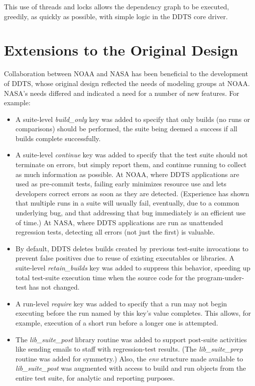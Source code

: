 \documentclass[conference]{IEEEtran}
\begin{document}
This use of threads and locks allows the dependency graph to be executed, greedily, as quickly as possible, with simple logic in the DDTS core driver.

\section{Extensions to the Original Design}

Collaboration between NOAA and NASA has been beneficial to the development of DDTS, whose original design reflected the needs of modeling groups at NOAA. NASA's needs differed and indicated a need for a number of new features. For example:

\begin{itemize}
\item A suite-level \emph{build\_only} key was added to specify that only builds (no runs or comparisons) should be performed, the suite being deemed a success if all builds complete successfully.
\item A suite-level \emph{continue} key was added to specify that the test suite should not terminate on errors, but simply report them, and continue running to collect as much information as possible. At NOAA, where DDTS applications are used as pre-commit tests, failing early minimizes resource use and lets developers correct errors as soon as they are detected. (Experience has shown that multiple runs in a suite will usually fail, eventually, due to a common underlying bug, and that addressing that bug immediately is an efficient use of time.) At NASA, where DDTS applications are run as unattended regression tests, detecting all errors (not just the first) is valuable.
\item By default, DDTS deletes builds created by previous test-suite invocations to prevent false positives due to reuse of existing executables or libraries. A suite-level \emph{retain\_builds} key was added to suppress this behavior, speeding up total test-suite execution time when the source code for the program-under-test has not changed.
\item A run-level \emph{require} key was added to specify that a run may not begin executing before the run named by this key's value completes. This allows, for example, execution of a short run before a longer one is attempted.
\item The \emph{lib\_suite\_post} library routine was added to support post-suite activities like sending emails to staff with regression-test results. (The \emph{lib\_suite\_prep} routine was added for symmetry.) Also, the \emph{env} structure made available to \emph{lib\_suite\_post} was augmented with access to build and run objects from the entire test suite, for analytic and reporting purposes.

\end{itemize}
\end{document}

